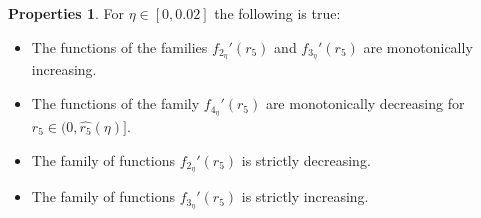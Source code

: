 \documentclass[final,11pt]{article}
\numberwithin{equation}{section}
\theoremstyle{definition}
\newtheorem{properties}[theorem]{Properties}
\begin{document}
\begin{properties}\label{fsp}
For $\eta\in[0,0.02]$ the following is true:
\begin{itemize}
\item The functions of the families $f_{2_{\eta}}'(r_{5})$ and $f_{3_{\eta}}'(r_{5})$ are monotonically increasing.
\item The functions of the family $f_{4_{\eta}}'(r_{5})$ are monotonically decreasing for $r_{5}\in(0,\hat{r_{5}}(\eta)]$.
\item The family of functions $f_{2_{\eta}}'(r_{5})$ is strictly decreasing.
\item The family of functions $f_{3_{\eta}}'(r_{5})$ is strictly increasing.
\end{itemize}
\end{properties}
\end{document}
